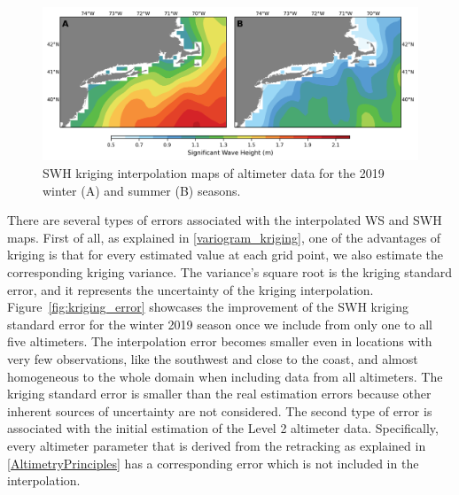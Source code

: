 \begin{figure}[H]
\centering
\includegraphics[width=0.95\linewidth]{Figures/Chapter5/kriging_wintsumm2019_wave.png}
\caption{SWH kriging interpolation maps of altimeter data for the 2019 winter (A) and summer (B) seasons.}
\label{fig:kriging_wave2019}
\end{figure}

There are several types of errors associated with the interpolated WS and SWH maps. First of all, as explained in \ref{variogram_kriging}, one of the advantages of kriging is that for every estimated value at each grid point, we also estimate the corresponding kriging variance. The variance's square root is the kriging standard error, and it represents the uncertainty of the kriging interpolation. Figure~\ref{fig:kriging_error} showcases the improvement of the SWH kriging standard error for the winter 2019 season once we include from only one to all five altimeters. The interpolation error becomes smaller even in locations with very few observations, like the southwest and close to the coast, and almost homogeneous to the whole domain when including data from all altimeters. The kriging standard error is smaller than the real estimation errors because other inherent sources of uncertainty are not considered. The second type of error is associated with the initial estimation of the Level 2 altimeter data. Specifically, every altimeter parameter that is derived from the retracking as explained in \ref{AltimetryPrinciples} has a corresponding error which is not included in the interpolation. 



